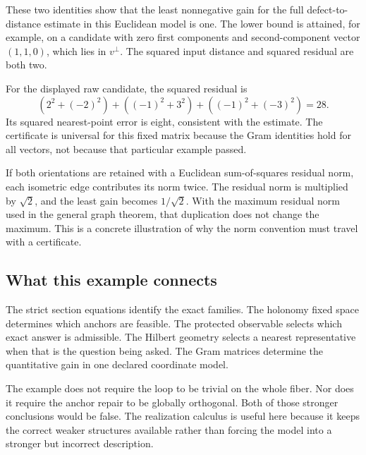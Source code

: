 These two identities show that the least nonnegative gain for the full defect-to-distance estimate in this Euclidean model is one. The lower bound is attained, for example, on a candidate with zero first components and second-component vector \((1,1,0)\), which lies in \(v^\perp\). The squared input distance and squared residual are both two.

For the displayed raw candidate, the squared residual is
\[
 (2^2+(-2)^2)+((-1)^2+3^2)+((-1)^2+(-3)^2)=28.
\]
Its squared nearest-point error is eight, consistent with the estimate. The certificate is universal for this fixed matrix because the Gram identities hold for all vectors, not because that particular example passed.

If both orientations are retained with a Euclidean sum-of-squares residual norm, each isometric edge contributes its norm twice. The residual norm is multiplied by \(\sqrt2\), and the least gain becomes \(1/\sqrt2\). With the maximum residual norm used in the general graph theorem, that duplication does not change the maximum. This is a concrete illustration of why the norm convention must travel with a certificate.

\subsection{What this example connects}
The strict section equations identify the exact families. The holonomy fixed space determines which anchors are feasible. The protected observable selects which exact answer is admissible. The Hilbert geometry selects a nearest representative when that is the question being asked. The Gram matrices determine the quantitative gain in one declared coordinate model.

The example does not require the loop to be trivial on the whole fiber. Nor does it require the anchor repair to be globally orthogonal. Both of those stronger conclusions would be false. The realization calculus is useful here because it keeps the correct weaker structures available rather than forcing the model into a stronger but incorrect description.
